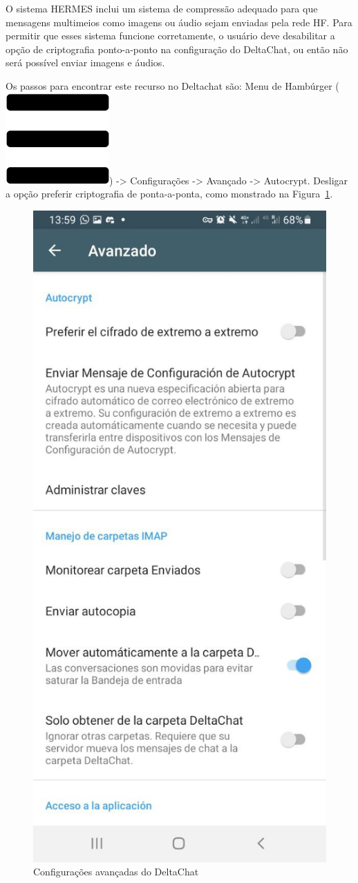 \documentclass[11pt,a4paper]{article}
\begin{document}
O sistema HERMES inclui um sistema de compressão adequado para que mensagens multimeios como imagens ou áudio sejam enviadas pela rede HF. Para permitir que esses sistema funcione corretamente, o usuário deve desabilitar a opção de criptografia ponto-a-ponto na configuração do DeltaChat, ou então não será possível enviar imagens e áudios.


Os passos para encontrar este recurso no Deltachat são: Menu de Hambúrger (\includegraphics[height=0.78\baselineskip]{pictures/burger.png}) -> Configurações -> Avançado -> Autocrypt. Desligar a opção preferir criptografia de ponta-a-ponta, como monstrado na Figura~\ref{fig:deltachat-adv_p2pe}.


\begin{figure}[H]
    \centering
    \includegraphics[width=0.3\columnwidth]{screenshots/deltachat/es/adv_p2pe_es.jpeg}
    	\caption{Configurações avançadas do DeltaChat}
	\vspace{-10pt}
    \label{fig:deltachat-adv_p2pe}
\end{figure}
\end{document}
